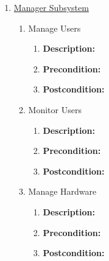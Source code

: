 \documentclass{article}
\begin{document}
\begin{enumerate}
	\item \underline{Manager Subsystem}
    \begin{enumerate}
		\item Manage Users
		\begin{enumerate}
			\item \textbf{Description:} 
			\item \textbf{Precondition:} 
			\item \textbf{Postcondition:}\newline
		\end{enumerate}
		
		\item Monitor Users
		\begin{enumerate}
			\item \textbf{Description:}
			\item \textbf{Precondition:} 
			\item \textbf{Postcondition:} \newline
		\end{enumerate}
		
		\item Manage Hardware
		\begin{enumerate}
			\item \textbf{Description:} 
			\item \textbf{Precondition:}
			\item \textbf{Postcondition:}\newline
		\end{enumerate}
	\end{enumerate}
	\end{enumerate}
	
\end{document}
